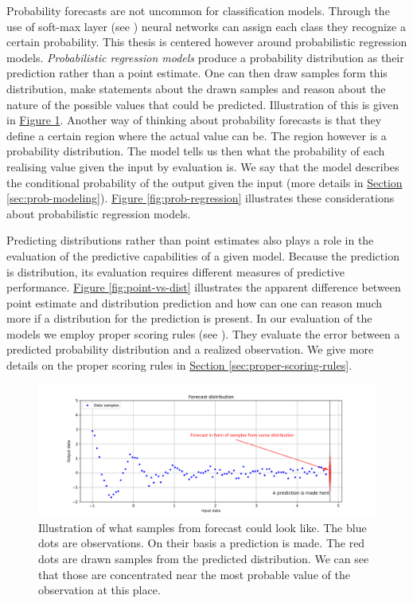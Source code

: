 \documentclass[12pt,a4paper,twoside]{scrartcl}
\numberwithin{equation}{section}
\newcommand{\reffig}[1]{\hyperref[#1]{Figure \ref*{#1}}}
\newcommand{\refsec}[1]{\hyperref[#1]{Section \ref*{#1}}}
\begin{document}
Probability forecasts are not uncommon for classification models. Through the use of soft-max layer (see \cite{denker1990}) neural networks can assign each class they recognize a certain probability. This thesis is centered however around probabilistic regression models. \emph{Probabilistic regression models} produce a probability distribution as their prediction rather than a point estimate. One can then draw samples form this distribution, make statements about the drawn samples and reason about the nature of the possible values that could be predicted. Illustration of this is given in \reffig{fig:pred-dist-draws}. Another way of thinking about probability forecasts is that they define a certain region where the actual value can be. The region however is a probability distribution. The model tells us then what the probability of each realising value given the input by evaluation is. We say that the model describes the conditional probability of the output given the input (more details in \refsec{sec:prob-modeling}). \reffig{fig:prob-regression} illustrates these considerations about probabilistic regression models. 

Predicting distributions rather than point estimates also plays a role in the evaluation of the predictive capabilities of a given model. Because the prediction is distribution, its evaluation requires different measures of predictive performance. \reffig{fig:point-vs-dist} illustrates the apparent difference between point estimate and distribution prediction and how can one can reason much more if a distribution for the prediction is present. In our evaluation of the models we employ proper scoring rules (see \cite{rafteryg2007}). They evaluate the error between a predicted probability distribution and a realized observation. We give more details on the proper scoring rules in \refsec{sec:proper-scoring-rules}.

\begin{center}
  \begin{figure}[htbp]
    \label{fig:pred-dist-draws}
    \centering
    \includegraphics[height=0.5\textwidth, width=1.0\textwidth]{figures/forecast.png}
    \caption[Forecast sample draws]{Illustration of what samples from forecast could look like. The blue dots are observations. On their basis a prediction is made. The red dots are drawn samples from the predicted distribution. We can see that those are concentrated near the most probable value of the observation at this place.}
  \end{figure}
\end{center}
\end{document}
